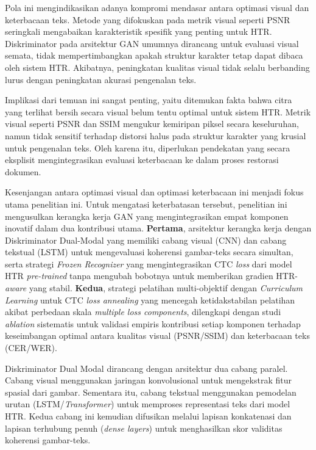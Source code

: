 \documentclass[12pt,a4paper]{book}
\begin{document}
\vspace{0.8em}
Pola ini mengindikasikan adanya kompromi mendasar antara optimasi visual dan keterbacaan teks. Metode yang difokuskan pada metrik visual seperti PSNR seringkali mengabaikan karakteristik spesifik yang penting untuk HTR. Diskriminator pada arsitektur GAN umumnya dirancang untuk evaluasi visual semata, tidak mempertimbangkan apakah struktur karakter tetap dapat dibaca oleh sistem HTR. Akibatnya, peningkatan kualitas visual tidak selalu berbanding lurus dengan peningkatan akurasi pengenalan teks.

\vspace{0.8em}
Implikasi dari temuan ini sangat penting, yaitu ditemukan fakta bahwa  citra yang terlihat bersih secara visual belum tentu optimal untuk sistem HTR. Metrik visual seperti PSNR dan SSIM mengukur kemiripan piksel secara keseluruhan, namun tidak sensitif terhadap distorsi halus pada struktur karakter yang krusial untuk pengenalan teks. Oleh karena itu, diperlukan pendekatan yang secara eksplisit mengintegrasikan evaluasi keterbacaan ke dalam proses restorasi dokumen.

\vspace{0.5cm}  %
Kesenjangan antara optimasi visual dan optimasi keterbacaan ini menjadi fokus utama penelitian ini. Untuk mengatasi keterbatasan tersebut, penelitian ini mengusulkan kerangka kerja GAN yang mengintegrasikan empat komponen inovatif dalam dua kontribusi utama. \textbf{Pertama}, arsitektur kerangka kerja dengan Diskriminator Dual-Modal yang memiliki cabang visual (CNN) dan cabang tekstual (LSTM) untuk mengevaluasi koherensi gambar-teks secara simultan, serta strategi \textit{Frozen Recognizer} yang mengintegrasikan CTC \textit{loss} dari model HTR \textit{pre-trained} tanpa mengubah bobotnya untuk memberikan gradien HTR-\textit{aware} yang stabil. \textbf{Kedua}, strategi pelatihan multi-objektif dengan \textit{Curriculum Learning} untuk CTC \textit{loss annealing} yang mencegah ketidakstabilan pelatihan akibat perbedaan skala \textit{multiple loss components}, dilengkapi dengan studi \textit{ablation} sistematis untuk validasi empiris kontribusi setiap komponen terhadap keseimbangan optimal antara kualitas visual (PSNR/SSIM) dan keterbacaan teks (CER/WER).

\vspace{0.8em}
Diskriminator Dual Modal dirancang dengan arsitektur dua cabang paralel. Cabang visual menggunakan jaringan konvolusional untuk mengekstrak fitur spasial dari gambar. Sementara itu, cabang tekstual menggunakan pemodelan urutan (LSTM/\textit{Transformer}) untuk memproses representasi teks dari model HTR. Kedua cabang ini kemudian difusikan melalui lapisan konkatenasi dan lapisan terhubung penuh (\textit{dense layers}) untuk menghasilkan skor validitas koherensi gambar-teks.
\end{document}
